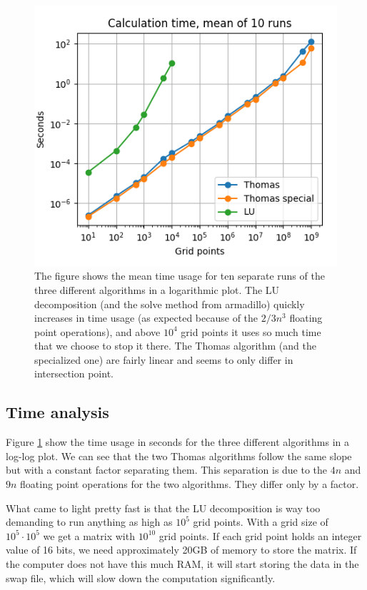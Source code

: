 \documentclass{emulateapj}
\begin{document}
        \begin{figure}[t]
            \centering
            \includegraphics[scale=0.7]{algorithm_time.png}
            \caption{The figure shows the mean time usage for ten separate runs of the three different algorithms in a logarithmic plot. The LU decomposition (and the solve method from armadillo) quickly increases in time usage (as expected because of the \(2/3n^{3}\) floating point operations), and above \(10^{4}\) grid points it uses so much time that we choose to stop it there. The Thomas algorithm (and the specialized one) are fairly linear and seems to only differ in intersection point.}
            \label{fig:algorithm_time}
        \end{figure}


    \subsection{Time analysis}
        
        Figure \ref{fig:algorithm_time} show the time usage in seconds for the three different algorithms in a log-log plot. We can see that the two Thomas algorithms follow the same slope but with a constant factor separating them. This separation is due to the $4n$ and $9n$ floating point operations for the two algorithms. They differ only by a factor.
        
        What came to light pretty fast is that the LU decomposition is way too demanding to run anything as high as \(10^5\) grid points. With a grid size of \(10^5 \cdot 10^5\) we get a matrix with \(10^{10}\) grid points. If each grid point holds an integer value of 16 bits, we need approximately 20GB of memory to store the matrix. If the computer does not have this much RAM, it will start storing the data in the swap file, which will slow down the computation significantly.
        
\end{document}
